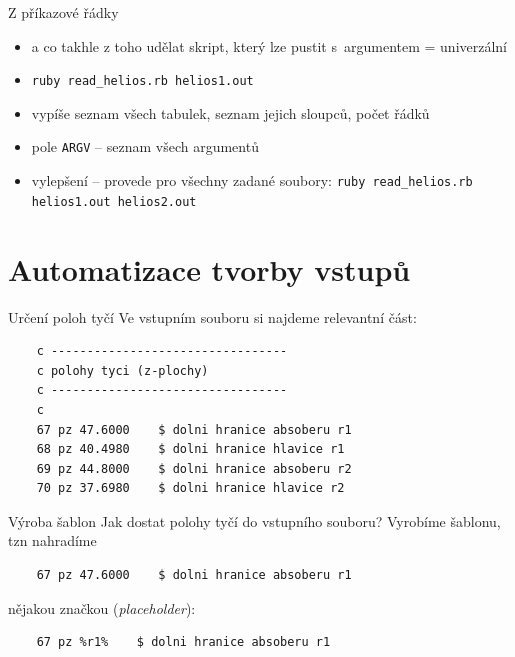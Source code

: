 \documentclass{beamer}
\begin{document}
\begin{frame}{Z příkazové řádky}
  \begin{itemize}
    \item a co takhle z toho udělat skript, který lze pustit s~argumentem = univerzální
    \item \texttt{ruby read\_helios.rb helios1.out}
    \item vypíše seznam všech tabulek, seznam jejich sloupců, počet řádků
    \item pole \texttt{ARGV} -- seznam všech argumentů
    \item vylepšení – provede pro všechny zadané soubory: \texttt{ruby read\_helios.rb helios1.out helios2.out}
  \end{itemize}
\end{frame}


\section{Automatizace tvorby vstupů}

\begin{frame}[fragile]{Určení poloh tyčí}
  Ve vstupním souboru si najdeme relevantní část:
  \scriptsize
  \begin{verbatim}
    c ---------------------------------
    c polohy tyci (z-plochy)
    c ---------------------------------
    c
    67 pz 47.6000    $ dolni hranice absoberu r1
    68 pz 40.4980    $ dolni hranice hlavice r1
    69 pz 44.8000    $ dolni hranice absoberu r2
    70 pz 37.6980    $ dolni hranice hlavice r2
  \end{verbatim}
\end{frame}

\begin{frame}[fragile]{Výroba šablon}
  Jak dostat polohy tyčí do vstupního souboru? Vyrobíme šablonu, tzn nahradíme
  \begin{verbatim}
    67 pz 47.6000    $ dolni hranice absoberu r1
  \end{verbatim}
  \pause
  nějakou značkou (\emph{placeholder}):
  \begin{verbatim}
    67 pz %r1%    $ dolni hranice absoberu r1
  \end{verbatim}
\end{frame}
\end{document}
